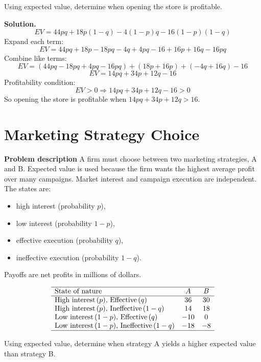 \begin{ExamProblems}
		Using expected value, determine when opening the store is profitable.
		
		\textbf{Solution.}
		\[
		EV=44pq+18p(1-q)-4(1-p)q-16(1-p)(1-q)
		\]
		Expand each term:
		\[
		EV=44pq+18p-18pq-4q+4pq-16+16p+16q-16pq
		\]
		Combine like terms:
		\[
		EV=(44pq-18pq+4pq-16pq)+(18p+16p)+(-4q+16q)-16
		\]
		\[
		EV=14pq+34p+12q-16
		\]
		Profitability condition:
		\[
		EV>0\Rightarrow 14pq+34p+12q-16>0
		\]
		So opening the store is profitable when \(14pq+34p+12q>16\).
		
		
		\hypertarget{c7-cu-ex9}{}
		\item
		\section{Marketing Strategy Choice}
		
		\textbf{Problem description}
		A firm must choose between two marketing strategies, A and B. Expected value is used because the firm wants the highest average profit over many campaigns. Market interest and campaign execution are independent. The states are:
		\begin{itemize}
			\item high interest (probability \(p\)),
			\item low interest (probability \(1-p\)),
			\item effective execution (probability \(q\)),
			\item ineffective execution (probability \(1-q\)).
		\end{itemize}
		Payoffs are net profits in millions of dollars.
		
		\[
		\begin{array}{lcc}
			\hline
			\text{State of nature} & A & B \\
			\hline
			\text{High interest}\,(p),\,\text{Effective}\,(q) & 36 & 30 \\
			\text{High interest}\,(p),\,\text{Ineffective}\,(1-q) & 14 & 18 \\
			\text{Low interest}\,(1-p),\,\text{Effective}\,(q) & -10 & 0 \\
			\text{Low interest}\,(1-p),\,\text{Ineffective}\,(1-q) & -18 & -8 \\
			\hline
		\end{array}
		\]
		
		Using expected value, determine when strategy A yields a higher expected value than strategy B.
		

\end{ExamProblems}
